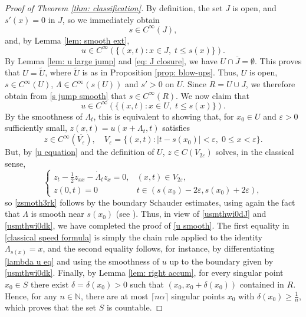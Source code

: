 \documentclass{article}
\numberwithin{equation}{section}
\numberwithin{figure}{section}
\theoremstyle{plain}
\theoremstyle{plain}
\theoremstyle{plain}
\theoremstyle{plain}
\theoremstyle{definition}
\theoremstyle{remark}
\def\vep{\varepsilon}
\begin{document}
\begin{proof}[Proof of Theorem \ref{thm: classification}] By definition, the set $J$ is open, and $s'(x)=0$ in $J$, so we immediately obtain
\begin{equation}  \label{s jump smooth}   s \in C^{\infty}(J),\end{equation}
and, by Lemma \ref{lem: smooth ext}, 
\begin{equation} \label{usmthwi0dJ}
    u\in C^{\infty}(\{(x,t): x\in J, \;t \leq s(x)\}).
\end{equation}
By Lemma \ref{lem: u large jump} and \eqref{eq: J closure}, we have $U \cap \overline{J}= \emptyset$. This proves that $U=\tilde{U}$, where $\tilde{U}$ is as in Proposition \ref{prop: blow-ups}. Thus, $U$ is open, $s\in C^{\infty}(U)$, $\Lambda \in C^{\infty}(s(U))$ and $s'>0$ on $U$.  Since $R=U \cup J$, we therefore obtain from \eqref{s jump smooth} that $s\in C^{\infty}(R)$. We now claim that 
\begin{equation} \label{usmthwi0dk}
    u\in C^{\infty}(\{(x,t): x\in U, \;t \leq s(x)\}).
\end{equation}
By the smoothness of $\Lambda_t$, this is equivalent to showing that,  for $x_0 \in U$ and $\vep>0$ sufficiently small, $z(x,t)=u(x+\Lambda_t,t)$ satisfies
\begin{equation} \label{zsmoth3rk} z\in C^{\infty}(\overline{V_{\vep}}), \quad V_{\vep}=\{(x,t): |t-s(x_0)|<\vep, \;0 \leq x < \vep\} .\end{equation}
But, by \eqref{u equation} and the definition of $U$, $z\in C(V_{2\vep})$ solves, in the classical sense, 
\begin{equation}\begin{cases} z_{t}-\frac{1}{2}z_{xx}-\dot \Lambda_tz_x=0, &(x,t)\in V_{2\vep},\\z(0,t)=0 & t\in (s(x_0)-2\vep,s(x_0)+2\vep),\end{cases}\end{equation}
so \eqref{zsmoth3rk} follows by the boundary Schauder estimates, using again the fact that $\Lambda$ is smooth near $s(x_0)$ (see \cite[Thm 4.22]{LiebermanBook}).  Thus, in view of \eqref{usmthwi0dJ} and \eqref{usmthwi0dk}, we have completed the proof of \eqref{u smooth}. The first equality in \eqref{classical speed formula} is simply the chain rule applied to the identity $\Lambda_{s(x)}=x$, and the second equality follows, for instance, by differentiating  \eqref{lambda u eq} and using the smoothness of $u$ up to the boundary given by \eqref{usmthwi0dk}. Finally, by Lemma \ref{lem: right accum}, for every singular point $x_0\in S$ there exist $\delta=\delta(x_0)>0$ such that $(x_0,x_0+\delta({x_0}))$ contained in $R$. Hence, for any $n\in \mathbb{N}$, there are at most $\lceil n \alpha\rceil$ singular points $x_0$ with $\delta(x_0)\geq \frac{1}{n}$, which proves that the set $S$ is countable.
\end{proof}
\end{document}
